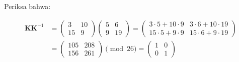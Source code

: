 \documentclass{article}
\begin{document}

Periksa bahwa:

\begin{align*}
\mathbf{KK}^{-1} &= \begin{pmatrix} 3 & 10 \\ 15 & 9 \end{pmatrix} \begin{pmatrix} 5 & 6 \\ 9 & 19 \end{pmatrix} = \begin{pmatrix} 3\cdot 5 + 10\cdot 9 & 3\cdot 6 + 10\cdot 19 \\ 15\cdot 5 + 9\cdot 9 & 15\cdot 6 + 9\cdot 19 \end{pmatrix} \\ &= \begin{pmatrix} 105 & 208 \\ 156 & 261 \end{pmatrix} \pmod{26} = \begin{pmatrix} 1 & 0 \\ 0 & 1 \end{pmatrix}
\end{align*}
\end{document}
